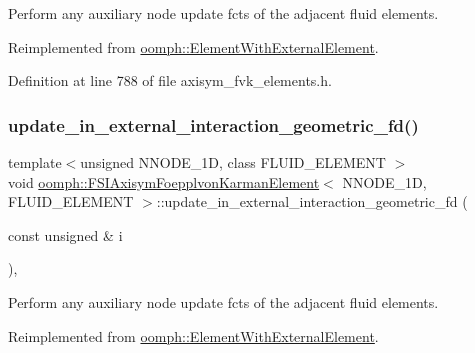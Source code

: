 Perform any auxiliary node update fcts of the adjacent fluid elements. 



Reimplemented from \hyperlink{classoomph_1_1ElementWithExternalElement_a2460f9def76ae512936eba0a1010cdc2}{oomph\+::\+Element\+With\+External\+Element}.



Definition at line 788 of file axisym\+\_\+fvk\+\_\+elements.\+h.

\mbox{\label{classoomph_1_1FSIAxisymFoepplvonKarmanElement_ac3284ec67a975078466ec03d55f65416}} 
\subsubsection{\texorpdfstring{update\+\_\+in\+\_\+external\+\_\+interaction\+\_\+geometric\+\_\+fd()}{update\_in\_external\_interaction\_geometric\_fd()}}
{\footnotesize\ttfamily template$<$unsigned N\+N\+O\+D\+E\+\_\+1D, class F\+L\+U\+I\+D\+\_\+\+E\+L\+E\+M\+E\+NT $>$ \\
void \hyperlink{classoomph_1_1FSIAxisymFoepplvonKarmanElement}{oomph\+::\+F\+S\+I\+Axisym\+Foepplvon\+Karman\+Element}$<$ N\+N\+O\+D\+E\+\_\+1D, F\+L\+U\+I\+D\+\_\+\+E\+L\+E\+M\+E\+NT $>$\+::update\+\_\+in\+\_\+external\+\_\+interaction\+\_\+geometric\+\_\+fd (\begin{DoxyParamCaption}\item[{const unsigned \&}]{i }\end{DoxyParamCaption})\hspace{0.3cm}{\ttfamily [inline]}, {\ttfamily [virtual]}}



Perform any auxiliary node update fcts of the adjacent fluid elements. 



Reimplemented from \hyperlink{classoomph_1_1ElementWithExternalElement_ab34f7db5cb5a473c6f5552f34af4a651}{oomph\+::\+Element\+With\+External\+Element}.




